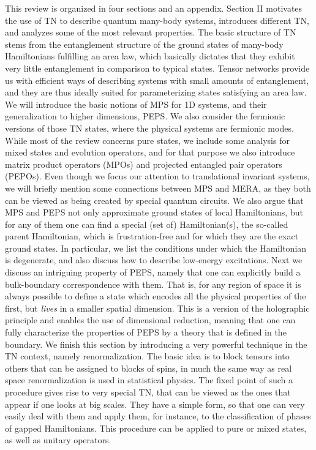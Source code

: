 \documentclass[rmp,aps,reprint,superscriptaddress,nobalancelastpage]{revtex4-1}
\begin{document}
This review is organized in four sections and an appendix. Section II motivates the use of TN to describe quantum many-body systems, introduces different TN, and analyzes some of the most relevant properties. The basic structure of TN stems from the entanglement structure of the ground states of many-body Hamiltonians fulfilling an area law, which basically dictates that they exhibit very little entanglement in comparison to typical states. Tensor networks provide us with efficient ways of describing systems with small amounts of entanglement, and they are thus ideally suited for parameterizing states satisfying an area law. We will introduce the basic notions of MPS for 1D systems, and their generalization to higher dimensions, PEPS. We also consider the fermionic versions of those TN states, where the physical systems are fermionic modes. While most of the review concerns pure states, we include some analysis for mixed states and evolution operators, and for that purpose we also introduce matrix product operators (MPOs) and
projected entangled pair operators (PEPOs). Even though we focus our attention to translational invariant systems, we will briefly mention some connections between MPS and MERA, as they both can be viewed as being created by special quantum circuits. We also argue that  MPS and PEPS not only approximate ground states of local Hamiltonians, but for any of them one can find a special (set of) Hamiltonian(s), the so-called parent Hamiltonian, which is frustration-free and for which they are the exact ground states. In particular, we list the conditions under which the Hamiltonian is degenerate, and also discuss how to describe low-energy excitations. Next we discuss an intriguing property of PEPS, namely that one can explicitly build a bulk-boundary correspondence with them. That is, for any region of space it is always possible to define a state which encodes all the physical properties of the first, but \emph{lives} in a smaller spatial dimension. This is a version of the  holographic principle and enables the use of dimensional reduction, meaning that one can fully characterize the properties of PEPS by a theory that is defined in the boundary. We finish this section by introducing a very powerful technique in the TN context, namely renormalization. The basic idea is to block tensors into others that can be assigned to blocks of spins, in much the same way as real space renormalization is used in statistical physics. The fixed point of such a procedure gives rise to very special TN, that can be viewed as the ones that appear if one looks at big scales. They have a simple form, so that one can very easily deal with them and apply them, for instance, to the classification of phases of gapped Hamiltonians. This procedure can be applied to pure or mixed states, as well as unitary operators.
\end{document}
